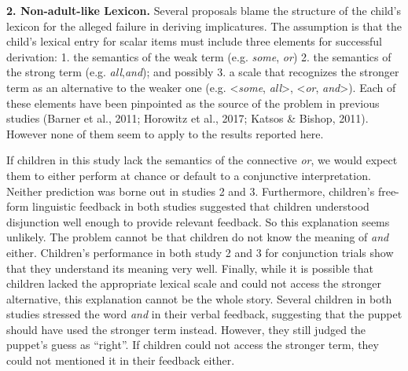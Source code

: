 \documentclass[floatsintext,man]{apa6}
\theoremstyle{definition}
\theoremstyle{definition}
\theoremstyle{definition}
\theoremstyle{remark}
\begin{document}
\textbf{2. Non-adult-like Lexicon.} Several proposals blame the
structure of the child's lexicon for the alleged failure in deriving
implicatures. The assumption is that the child's lexical entry for
scalar items must include three elements for successful derivation: 1.
the semantics of the weak term (e.g. \emph{some}, \emph{or}) 2. the
semantics of the strong term (e.g. \emph{all},\emph{and}); and possibly
3. a scale that recognizes the stronger term as an alternative to the
weaker one (e.g. \textless{}\emph{some}, \emph{all}\textgreater{},
\textless{}\emph{or}, \emph{and}\textgreater{}). Each of these elements
have been pinpointed as the source of the problem in previous studies
(Barner et al., 2011; Horowitz et al., 2017; Katsos \& Bishop, 2011).
However none of them seem to apply to the results reported here.

If children in this study lack the semantics of the connective
\emph{or}, we would expect them to either perform at chance or default
to a conjunctive interpretation. Neither prediction was borne out in
studies 2 and 3. Furthermore, children's free-form linguistic feedback
in both studies suggested that children understood disjunction well
enough to provide relevant feedback. So this explanation seems unlikely.
The problem cannot be that children do not know the meaning of
\emph{and} either. Children's performance in both study 2 and 3 for
conjunction trials show that they understand its meaning very well.
Finally, while it is possible that children lacked the appropriate
lexical scale and could not access the stronger alternative, this
explanation cannot be the whole story. Several children in both studies
stressed the word \emph{and} in their verbal feedback, suggesting that
the puppet should have used the stronger term instead. However, they
still judged the puppet's guess as \enquote{right}. If children could
not access the stronger term, they could not mentioned it in their
feedback either.
\end{document}

